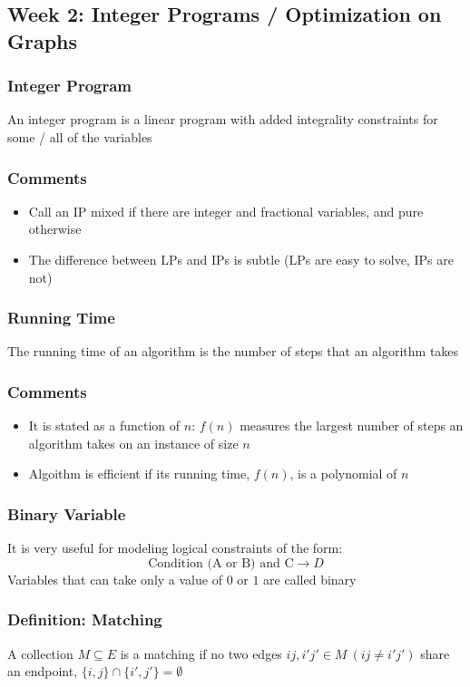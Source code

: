 \documentclass[11pt]{article}
\begin{document}
\subsection{Week 2: Integer Programs / Optimization on Graphs}
\subsubsection{Integer Program}
An integer program is a linear program with added integrality constraints for some / all of the variables 
\subsubsection*{Comments}
\begin{itemize}
  \item Call an IP mixed if there are integer and fractional variables, and pure otherwise 
  \item The difference between LPs and IPs is subtle (LPs are easy to solve, IPs are not)
\end{itemize}
\subsubsection{Running Time}
The running time of an algorithm is the number of steps that an algorithm takes 
\subsubsection*{Comments}
\begin{itemize}
  \item It is stated as a function of $n$: $f(n)$ measures the largest number of steps an algorithm takes on an instance of size $n$
  \item Algoithm is efficient if its running time, $f(n)$, is a polynomial of $n$
\end{itemize}
\subsubsection{Binary Variable}
It is very useful for modeling logical constraints of the form: \[\text{Condition (A or B) and C}\rightarrow D\]
Variables that can take only a value of $0$ or $1$ are called binary 
\subsubsection{Definition: Matching}
A collection $M\subseteq E$ is a matching if no two edges $ij, i'j'\in M\ (ij\neq i'j')$ share an endpoint, $\{i,j\}\cap\{i',j'\}=\emptyset$
\end{document}
